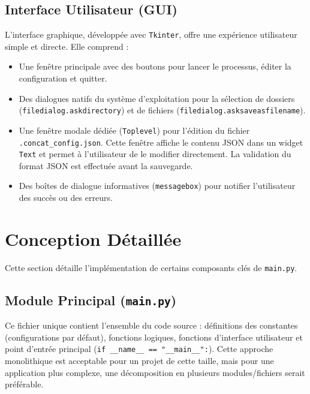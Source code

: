 \documentclass[11pt, a4paper]{article}
\begin{document}
\subsection{Interface Utilisateur (GUI)}
L'interface graphique, développée avec \texttt{Tkinter}, offre une expérience utilisateur simple et directe. Elle comprend :
\begin{itemize}
    \item Une fenêtre principale avec des boutons pour lancer le processus, éditer la configuration et quitter.
    \item Des dialogues natifs du système d'exploitation pour la sélection de dossiers (\texttt{filedialog.askdirectory}) et de fichiers (\texttt{filedialog.asksaveasfilename}).
    \item Une fenêtre modale dédiée (\texttt{Toplevel}) pour l'édition du fichier \texttt{.concat\_config.json}. Cette fenêtre affiche le contenu JSON dans un widget \texttt{Text} et permet à l'utilisateur de le modifier directement. La validation du format JSON est effectuée avant la sauvegarde.
    \item Des boîtes de dialogue informatives (\texttt{messagebox}) pour notifier l'utilisateur des succès ou des erreurs.
\end{itemize}

\section{Conception Détaillée}

Cette section détaille l'implémentation de certains composants clés de \texttt{main.py}.

\subsection{Module Principal (\texttt{main.py})}
Ce fichier unique contient l'ensemble du code source : définitions des constantes (configurations par défaut), fonctions logiques, fonctions d'interface utilisateur et point d'entrée principal (\texttt{if \_\_name\_\_ == "\_\_main\_\_":}). Cette approche monolithique est acceptable pour un projet de cette taille, mais pour une application plus complexe, une décomposition en plusieurs modules/fichiers serait préférable.
\end{document}
